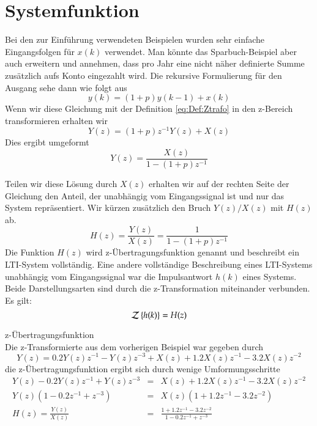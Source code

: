 \section{Systemfunktion\label{sec:Systemfunktion}}
Bei den zur Einführung verwendeten Beispielen wurden sehr einfache
Eingangsfolgen für $x(k)$ verwendet. Man könnte das
Sparbuch-Beispiel aber auch erweitern und annehmen, dass pro Jahr
eine nicht näher definierte Summe zusätzlich aufs Konto eingezahlt
wird. Die rekursive Formulierung für den Ausgang sehe dann wie
folgt aus
\begin{equation}\label{eq:example3:Eingang}
    y(k) = (1+p) y(k-1) + x(k)
\end{equation}
Wenn wir diese Gleichung mit der Definition \ref{eq:Def:Ztrafo} in
den z-Bereich transformieren erhalten wir
\begin{equation}\label{eq:eaxample3:zLoesung}
    Y(z) = (1+p)z^{-1} Y(z) + X(z)
\end{equation}
Dies ergibt umgeformt
\begin{equation}\label{eq:eaxample3:zLoesung2}
    Y(z) = \frac{X(z)}{1-(1+p)z^{-1}}
\end{equation}

Teilen wir diese Lösung durch $X(z)$ erhalten wir auf der rechten
Seite der Gleichung den Anteil, der unabhängig vom Eingangssignal
ist und nur das System repräsentiert. Wir kürzen zusätzlich den
Bruch $Y(z)/X(z)$ mit $H(z)$ ab.
\begin{equation}\label{eq:example3:Systemfunktion}
    H(z) = \frac{Y(z)}{X(z)} = \frac{1}{1-(1+p)z^{-1}}
\end{equation}
Die Funktion $H(z)$ wird z-Übertragungsfunktion genannt und
beschreibt ein LTI-System vollständig. Eine andere vollständige
Beschreibung eines LTI-Systems unabhängig vom Eingangssignal war
die Impulsantwort $h(k)$ eines Systems. Beide Darstellungsarten
sind durch die z-Transformation miteinander verbunden. Es gilt:
\begin{equation}\label{eq:Def:UbertragFunktion}
    {\cal Z}\left\{h(k)\right\} = H(z)
\end{equation}
\begin{example}
z-Übertragungsfunktion\\
Die z-Transformierte aus dem vorherigen Beispiel war gegeben durch
\[
    Y(z) = 0.2Y(z) z^{-1} - Y(z) z^{-3} + X(z) + 1.2X(z) z^{-1} - 3.2X(z) z^{-2}
\]
die z-Übertragungsfunktion ergibt sich durch wenige
Umformungsschritte
\begin{eqnarray}\nonumber
    Y(z)- 0.2Y(z) z^{-1} + Y(z) z^{-3} & = &  X(z) + 1.2X(z) z^{-1} - 3.2X(z) z^{-2}\\\nonumber
    Y(z) \left(1-0.2z^{-1} + z^{-3} \right) &=& X(z) \left(1 +1.2z^{-1} - 3.2 z^{-2} \right)\\
    H(z) = \frac{Y(z)}{X(z)} &= & \frac{1 +1.2z^{-1} - 3.2 z^{-2}}{1-0.2z^{-1} + z^{-3}}
\end{eqnarray}
\end{example}

